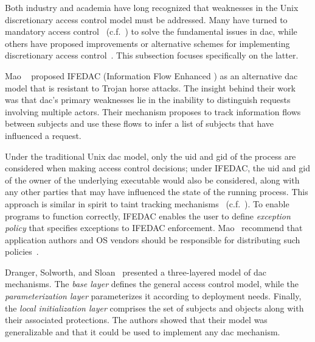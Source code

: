 Both industry and academia have long recognized that weaknesses in the Unix discretionary
access control model must be addressed. Many have turned to mandatory access
control~\cite{spencer1999_flask, smalley2001_selinux, wright2002_lsm, cowan2000_apparmor,
schaufler_smack, schreuders2012_towards, hu2013_fsf, harada2004_tomoyo, salaun_landlockio,
singh2019_krsi} (c.f.\ ) to solve the fundamental issues in \gls{dac}, while
others have proposed improvements or alternative schemes for implementing discretionary
access control~\cite{mao2009_trojan_resistant_dac, solworth2004_layered_dac,
dranger2006_dac_complexity, dittmer2014_setuid, tsafrir2008_setuid, chen2002_setuid}. This
subsection focuses specifically on the latter.

Mao \etal~\cite{mao2009_trojan_resistant_dac} proposed IFEDAC (Information Flow Enhanced
) as an alternative \gls{dac} model that is resistant to Trojan horse
attacks.  The insight behind their work was that \gls{dac}'s primary weaknesses lie in the
inability to distinguish requests involving multiple actors. Their mechanism proposes to
track information flows between subjects and use these flows to infer a list of subjects
that have influenced a request.

Under the traditional Unix \gls{dac} model, only the \gls{uid} and \gls{gid} of the
process are considered when making access control decisions; under IFEDAC, the \gls{uid}
and \gls{gid} of the owner of the underlying executable would also be considered, along
with any other parties that may have influenced the state of the running process. This
approach is similar in spirit to taint tracking mechanisms~\cite{livshits2012_dynamic}
(c.f.\ ). To enable programs to function correctly, IFEDAC enables
the user to define \textit{exception policy} that specifies exceptions to IFEDAC
enforcement. Mao \etal~recommend that application authors and OS vendors should be
responsible for distributing such policies~\cite{mao2009_trojan_resistant_dac}.

Dranger, Solworth, and Sloan~\cite{solworth2004_layered_dac, dranger2006_dac_complexity}
presented a three-layered model of \gls{dac} mechanisms. The \textit{base layer} defines
the general access control model, while the \textit{parameterization layer} parameterizes
it according to deployment needs.  Finally, the \textit{local initialization layer}
comprises the set of subjects and objects along with their associated protections. The
authors showed that their model was generalizable and that it could be used to implement
any \gls{dac} mechanism.

